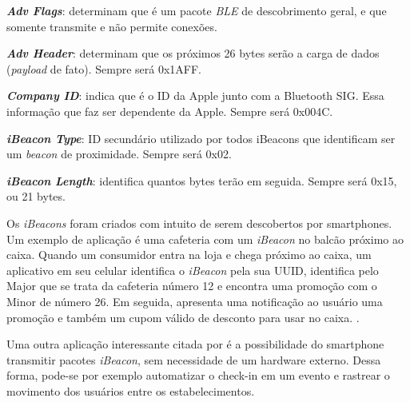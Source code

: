 \documentclass[
	12pt,				%
	openright,			%
	oneside,			%
	a4paper,			%
	chapter=TITLE,		%
	english,			%
	brazil				%
	]{abntex2}
\begin{document}
{\begin{alineas}
	\item \textit{\textbf{Adv Flags}}: determinam que é um pacote \textit{BLE} de descobrimento geral, e que somente transmite e não permite conexões.
	\item \textit{\textbf{Adv Header}}: determinam que os próximos 26 bytes serão a carga de dados (\textit{payload} de fato). Sempre será 0x1AFF.
	\item \textit{\textbf{Company ID}}: indica que é o ID da Apple junto com a Bluetooth SIG. Essa informação que faz ser dependente da Apple. Sempre será 0x004C.
	\item\textit{\textbf{iBeacon Type}}: ID secundário utilizado por todos iBeacons que identificam ser um \textit{beacon} de proximidade. Sempre será 0x02.
	\item\textit{\textbf{iBeacon Length}}: identifica quantos bytes terão em seguida. Sempre será 0x15, ou 21 bytes.
\end{alineas}

\begin{figure}[h!]
\end{figure}

Os \textit{iBeacons} foram criados com intuito de serem descobertos por smartphones. Um exemplo de aplicação é uma cafeteria com um \textit{iBeacon} no balcão próximo ao caixa. Quando um consumidor entra na loja e chega próximo ao caixa, um aplicativo em seu celular identifica o \textit{iBeacon} pela sua UUID, identifica pelo Major que se trata da cafeteria número 12 e encontra uma promoção com o Minor de número 26. Em seguida, apresenta uma notificação ao usuário uma promoção e também um cupom válido de desconto para usar no caixa. \cite{arm-beacons}.

Uma outra aplicação interessante citada por  é a possibilidade do smartphone transmitir pacotes \textit{iBeacon}, sem necessidade de um hardware externo. Dessa forma, pode-se por exemplo automatizar o check-in em um evento e rastrear o movimento dos usuários entre os estabelecimentos.

}
\end{document}

